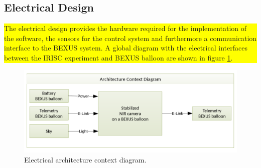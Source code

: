 \pagebreak
\subsection{Electrical Design}
\colorbox{yellow}{\parbox{\textwidth}{The electrical design provides the hardware required for the implementation of the software, the sensors for the control system and furthermore a communication interface to the BEXUS system. A global diagram with the electrical interfaces between the IRISC experiment and BEXUS balloon are shown in figure \ref{fig:elec-ACD}.}} %
\vspace{-.5cm}
\begin{figure}[H]
	\centering
	\includegraphics[width=.6\textwidth]{4-experiment-design/img/electrical/ArchitectureContext.png}
	\caption{Electrical architecture context diagram.}
	\label{fig:elec-ACD}
\end{figure}


